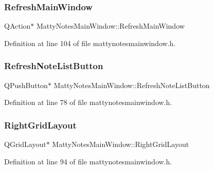 \subsubsection{\texorpdfstring{Refresh\+Main\+Window}{RefreshMainWindow}}
{\footnotesize\ttfamily Q\+Action$\ast$ Matty\+Notes\+Main\+Window\+::\+Refresh\+Main\+Window\hspace{0.3cm}{\ttfamily [private]}}



Definition at line 104 of file mattynotesmainwindow.\+h.

\hypertarget{classMattyNotesMainWindow_acbbcc35de95ac20e40222e05d18c4c18}{}\label{classMattyNotesMainWindow_acbbcc35de95ac20e40222e05d18c4c18} 
\subsubsection{\texorpdfstring{Refresh\+Note\+List\+Button}{RefreshNoteListButton}}
{\footnotesize\ttfamily Q\+Push\+Button$\ast$ Matty\+Notes\+Main\+Window\+::\+Refresh\+Note\+List\+Button\hspace{0.3cm}{\ttfamily [private]}}



Definition at line 78 of file mattynotesmainwindow.\+h.

\hypertarget{classMattyNotesMainWindow_af5caef9487e095083f52c4989e1af926}{}\label{classMattyNotesMainWindow_af5caef9487e095083f52c4989e1af926} 
\subsubsection{\texorpdfstring{Right\+Grid\+Layout}{RightGridLayout}}
{\footnotesize\ttfamily Q\+Grid\+Layout$\ast$ Matty\+Notes\+Main\+Window\+::\+Right\+Grid\+Layout\hspace{0.3cm}{\ttfamily [private]}}



Definition at line 94 of file mattynotesmainwindow.\+h.

\hypertarget{classMattyNotesMainWindow_a996c73ff73f44e875ce48192db687abb}{}\label{classMattyNotesMainWindow_a996c73ff73f44e875ce48192db687abb} 
